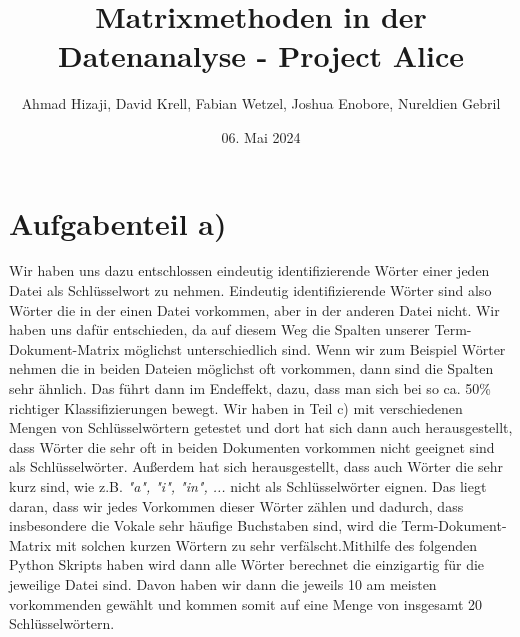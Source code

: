 \documentclass{article}
\title{Matrixmethoden in der Datenanalyse - Project Alice}
\author{Ahmad Hizaji, David Krell, Fabian Wetzel, Joshua Enobore, Nureldien Gebril }
\date{06. Mai 2024}
\begin{document}
\maketitle

\newpage 
\section*{Aufgabenteil a)}
Wir haben uns dazu entschlossen eindeutig identifizierende Wörter einer jeden Datei als Schlüsselwort zu nehmen. Eindeutig identifizierende Wörter sind also Wörter die in der einen Datei vorkommen, aber in der anderen Datei nicht. Wir haben uns dafür entschieden, da auf diesem Weg die Spalten unserer Term-Dokument-Matrix möglichst unterschiedlich sind. Wenn wir zum Beispiel Wörter nehmen die in beiden Dateien möglichst oft vorkommen, dann sind die Spalten sehr ähnlich. Das führt dann im Endeffekt, dazu, dass man sich bei so ca. 50\% richtiger Klassifizierungen bewegt. Wir haben in Teil c) mit verschiedenen Mengen von Schlüsselwörtern getestet und dort hat sich dann auch herausgestellt, dass Wörter die sehr oft in beiden Dokumenten vorkommen nicht geeignet sind als Schlüsselwörter. Außerdem hat sich herausgestellt,  dass auch Wörter die sehr kurz sind, wie z.B. \textit{"a", "i", "in", ...} nicht als Schlüsselwörter eignen. Das liegt daran, dass wir jedes Vorkommen dieser Wörter zählen und dadurch, dass insbesondere die Vokale sehr häufige Buchstaben sind, wird die Term-Dokument-Matrix mit solchen kurzen Wörtern zu sehr verfälscht.\newline\newline Mithilfe des folgenden Python Skripts haben wird dann alle Wörter berechnet die einzigartig für die jeweilige Datei sind. Davon haben wir dann die jeweils 10 am meisten vorkommenden gewählt und kommen somit auf eine Menge von insgesamt 20 Schlüsselwörtern.
\end{document}
